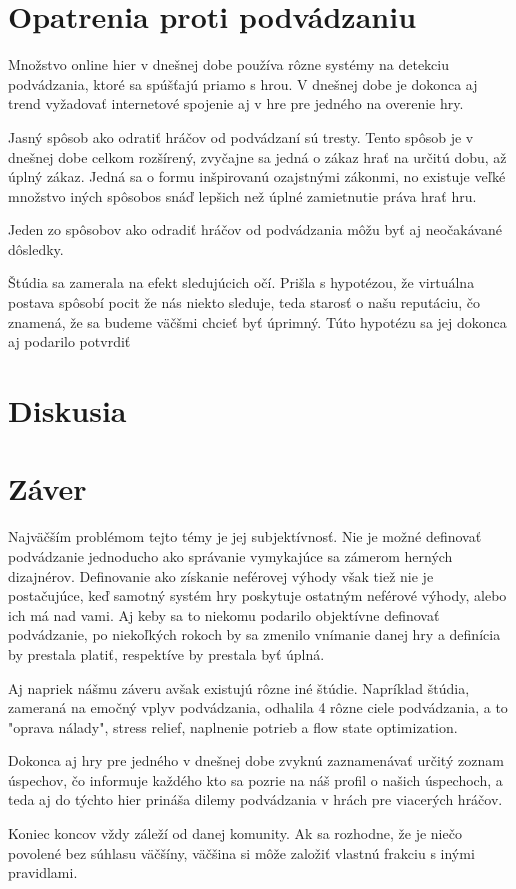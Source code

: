 \documentclass[10pt, oneside, slovak,a4paper]{article}
\begin{document}
\section{Opatrenia proti podvádzaniu}

Množstvo online hier v dnešnej dobe používa rôzne systémy na detekciu podvádzania, ktoré sa spúšťajú priamo s hrou. V dnešnej dobe je dokonca aj trend vyžadovať internetové spojenie aj v hre pre jedného na overenie hry.

Jasný spôsob ako odratiť hráčov od podvádzaní sú tresty. Tento spôsob je v dnešnej dobe celkom rozšírený, zvyčajne sa jedná o zákaz hrať na určitú dobu, až úplný zákaz. Jedná sa o formu inšpirovanú ozajstnými zákonmi, no existuje veľké množstvo iných spôsobos snáď lepšich než úplné zamietnutie práva hrať hru.

Jeden zo spôsobov ako odradiť hráčov od podvádzania môžu byť aj neočakávané dôsledky. 

Štúdia sa zamerala na efekt sledujúcich očí. Prišla s hypotézou, že virtuálna postava spôsobí pocit že nás niekto sleduje, teda starosť o našu reputáciu, čo znamená, že sa budeme väčšmi chcieť byť úprimný. \cite{not_alone} Túto hypotézu sa jej dokonca aj podarilo potvrdiť

\section{Diskusia}
\section{Záver} 

Najväčším problémom tejto témy je jej subjektívnosť. Nie je možné definovať podvádzanie jednoducho ako správanie vymykajúce sa zámerom herných dizajnérov. Definovanie ako získanie neférovej výhody však tiež nie je postačujúce, keď samotný systém hry poskytuje ostatným neférové výhody, alebo ich má nad vami. Aj keby sa to niekomu podarilo objektívne definovať podvádzanie, po niekoľkých rokoch by sa zmenilo vnímanie danej hry a definícia by prestala platiť, respektíve by prestala byť úplná.

Aj napriek nášmu záveru avšak existujú rôzne iné štúdie. Napríklad  štúdia\cite{mood}, zameraná na emočný vplyv podvádzania, odhalila 4 rôzne ciele podvádzania, a to "oprava nálady", stress relief, naplnenie potrieb a flow state optimization. 

Dokonca aj hry pre jedného v dnešnej dobe zvyknú zaznamenávať určitý zoznam úspechov, čo informuje každého kto sa pozrie na náš profil o našich úspechoch, a teda aj do týchto hier prináša dilemy podvádzania v hrách pre viacerých hráčov.

Koniec koncov vždy záleží od danej komunity. Ak sa rozhodne, že je niečo povolené bez súhlasu väčšíny, väčšina si môže založiť vlastnú frakciu s inými pravidlami.


\nocite{*}


\end{document}
